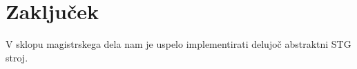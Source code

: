 %

\chapter{Zaključek}
\label{ch:zakljucek}

V sklopu magistrskega dela nam je uspelo implementirati delujoč abstraktni STG stroj.